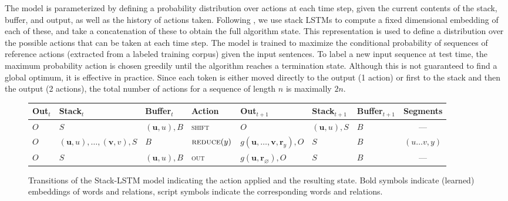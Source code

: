 \documentclass[11pt,letterpaper]{article}
\newcommand{\ignore}[1]{}
\newcommand{\guillaumecomment}[1]{\ignore{\textcolor{orange}{\textbf{[#1 --\textsc{GL}]}}}}
\begin{document}
The model is parameterized by defining a probability distribution over actions at each time step, given the current contents of the stack, buffer, and output, as well as the history of actions taken. Following , we use stack LSTMs to compute a fixed dimensional embedding of each of these, and take a concatenation of these to obtain the full algorithm state. This representation is used to define a distribution over the possible actions that can be taken at each time step. The model is trained to maximize the conditional probability of sequences of reference actions (extracted from a labeled training corpus) given the input sentences. To label a new input sequence at test time, the maximum probability action is chosen greedily until the algorithm reaches a termination state. Although this is not guaranteed to find a global optimum, it is effective in practice. Since each token is either moved directly to the output (1 action) or first to the stack and then the output (2 actions), the total number of actions for a sequence of length $n$ is maximally $2n$.

\begin{figure}
\begin{small}
\centering
\begin{tabular}{lll|l|lll|c}
\textbf{Out}$_t$ & \textbf{Stack}$_t$ & \textbf{Buffer}$_t$ & \textbf{Action} & \textbf{Out}$_{t+1}$ & \textbf{Stack}$_{t+1}$ & \textbf{Buffer}$_{t+1}$ & \textbf{Segments} \\
\hline
$O$ & $S$ & $(\mathbf{u},u),B$ & \textsc{shift} & $O$ & $(\mathbf{u},u),S$ & $B$ & --- \\ %
$O$ & $(\mathbf{u},u),\ldots,(\mathbf{v},v),S$ & $B$  &$\textsc{reduce}(y)$ & $g(\mathbf{u},\ldots,\mathbf{v},\mathbf{r}_y),O$ & $S$ & $B$ & $(u\ldots v,y)$ \\
$O$ & $S$ & $(\mathbf{u},u),B$ & \textsc{out} & $g(\mathbf{u},\mathbf{r}_{\varnothing}),O$ & $S$ & $B$ & ---
\end{tabular}
\end{small}
\caption{Transitions of the Stack-LSTM model indicating the action applied and the resulting state. \guillaumecomment{this first sentence is maybe a little bit confusing} Bold symbols indicate (learned) embeddings of words and relations, script symbols indicate the corresponding words and relations.}
\label{fig:parser}
\end{figure}

\ignore{
\begin{figure}
  \centering
  \texttt{[image: stack\_lstm]}
  \caption{Intermediate state computation for the sentence \emph{Mark Watney visited Mars} with the Stack-LSTM model.}
  \label{figurekazuya}
\end{figure}
}
\end{document}

